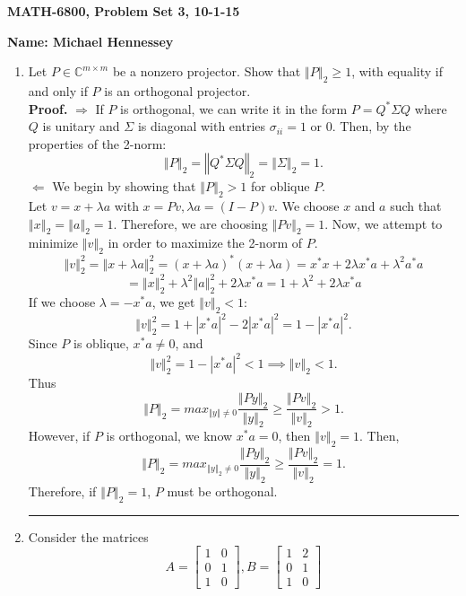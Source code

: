 \documentclass[12pt]{article}
\numberwithin{equation}{section}
\newcommand{\norm}[1]{\left\Vert#1\right\Vert}
\newenvironment{proof}[1][Proof]{\textbf{#1.} }{\ \rule{0.5em}{0.5em}}
\begin{document}
{\large\bf MATH-6800, Problem Set 3, 10-1-15}



\vspace{6 ex}

{\bf Name: Michael Hennessey} \hfill

\vspace{6 ex}

\begin{enumerate}
\item Let $P\in \mathbb{C}^{m\times m}$ be a nonzero projector. Show that $\norm{P}_2\geq 1$, with equality if and only if $P$ is an orthogonal projector.\\

    \begin{proof}
    $\Rightarrow$ If $P$ is orthogonal, we can write it in the form $P=Q^*\Sigma Q$ where $Q$ is unitary and $\Sigma$ is diagonal with entries $\sigma_{ii}=1\text{ or }0$. Then, by the properties of the 2-norm:
    $$\norm{P}_2=\norm{Q^*\Sigma Q}_2=\norm{\Sigma}_2=1.$$
    $\Leftarrow$ We begin by showing that $\norm{P}_2>1$ for oblique $P$.\\
 Let $v=x+\lambda a$ with $x=Pv,\lambda a=(I-P)v$. We choose $x$ and $a$ such that $\norm{x}_2=\norm{a}_2=1$. Therefore, we are choosing $\norm{Pv}_2=1$. Now, we attempt to minimize $\norm{v}_2$ in order to maximize the 2-norm of $P$.
    $$\norm{v}_2^2=\norm{x+\lambda a}^2_2=(x+\lambda a)^*(x+\lambda a)=x^*x+2\lambda x^*a+\lambda^2 a^*a$$
    $$=\norm{x}_2^2+\lambda^2\norm{a}^2_2+2\lambda x^*a=1+\lambda^2+2\lambda x^*a$$
    If we choose $\lambda=-x^*a$, we get $\norm{v}_2<1$:
    $$\norm{v}_2^2=1+|x^*a|^2-2|x^*a|^2=1-|x^*a|^2.$$
    Since $P$ is oblique, $x^*a\neq 0$, and
    $$\norm{v}_2^2=1-|x^*a|^2<1\implies \norm{v}_2<1.$$
    Thus
    $$\norm{P}_2 =max_{\norm{y}\neq 0}\frac{\norm{Py}_2}{\norm{y}_2}\geq\frac{\norm{Pv}_2}{\norm{v}_2}>1.$$
    However, if $P$ is orthogonal, we know $x^*a=0$, then $\norm{v}_2=1$. Then,
    $$\norm{P}_2=max_{\norm{y}_2\neq0}\frac{\norm{Py}_2}{\norm{y}_2}\geq\frac{\norm{Pv}_2}{\norm{v}_2}=1.$$
    Therefore, if $\norm{P}_2=1$, $P$ must be orthogonal.
    \end{proof}
    \pagebreak
\item Consider the matrices
$$A=\left[\begin{array}{cc} 1&0\\0&1\\1&0\end{array}\right],B=\left[\begin{array}{cc}1&2\\0&1\\1&0\end{array}\right]$$

\end{enumerate}
\end{document}
